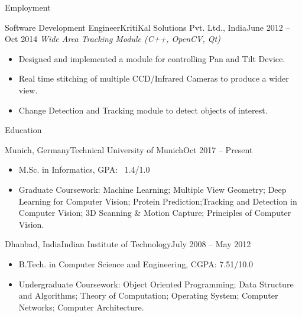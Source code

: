 \documentclass[]{mcdowellcv}
\begin{document}
\begin{cvsection}{Employment}
\begin{cvsubsection}{Software Development Engineer}{KritiKal Solutions Pvt. Ltd., India}{June 2012 -- Oct 2014}
            \textit{Wide Area Tracking Module (C++, OpenCV, Qt)}
            \begin{itemize}
                \item Designed and implemented a module for controlling Pan and Tilt Device.
                \item Real time stitching of multiple CCD/Infrared Cameras to produce a wider view.
                \item Change Detection and Tracking module to detect objects of interest.
            \end{itemize}
        \end{cvsubsection}
    \end{cvsection}
    

    \begin{cvsection}{Education}
        \begin{cvsubsection}{Munich, Germany}{Technical University of Munich}{Oct 2017 -- Present}
            \begin{itemize}
                \item M.Sc. in Informatics, GPA: ~1.4/1.0
                \item Graduate Coursework: Machine Learning; Multiple View Geometry; Deep Learning for Computer Vision; Protein Prediction;Tracking and Detection in Computer Vision; 3D Scanning \& Motion Capture; Principles of Computer Vision.
            \end{itemize}
        \end{cvsubsection}
        \begin{cvsubsection}{Dhanbad, India}{Indian Institute of Technology}{July 2008 -- May 2012}
            \begin{itemize}
                \item B.Tech. in Computer Science and Engineering,  CGPA: 7.51/10.0
                \item Undergraduate Coursework: Object Oriented Programming; Data Structure and Algorithms; Theory of Computation; Operating System; Computer Networks; Computer Architecture.
            \end{itemize}
        \end{cvsubsection}
    \end{cvsection}
    
\end{document}
